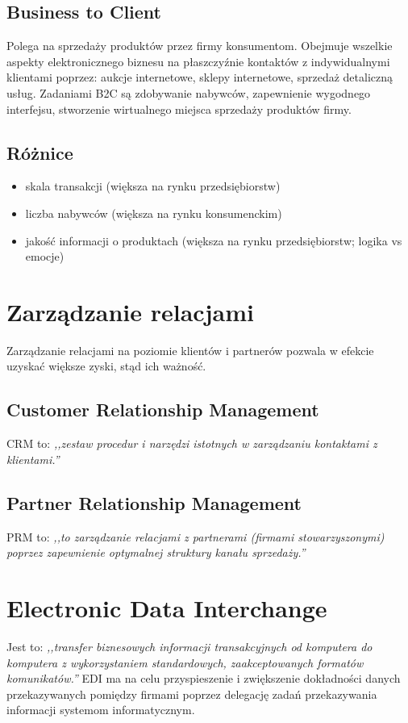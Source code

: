 \documentclass{article}
\begin{document}
\subsection{Business to Client}
Polega na sprzedaży produktów przez firmy konsumentom. Obejmuje wszelkie aspekty elektronicznego biznesu na płaszczyźnie kontaktów z indywidualnymi klientami poprzez: aukcje internetowe, sklepy internetowe, sprzedaż detaliczną usług. Zadaniami B2C są zdobywanie nabywców, zapewnienie wygodnego interfejsu, stworzenie wirtualnego miejsca sprzedaży produktów firmy.
\subsection{Różnice}
\begin{itemize}
\item skala transakcji (większa na rynku przedsiębiorstw)
\item liczba nabywców (większa na rynku konsumenckim)
\item jakość informacji o produktach (większa na rynku przedsiębiorstw; logika vs emocje)
\end{itemize}
\section{Zarządzanie relacjami}
Zarządzanie relacjami na poziomie klientów i partnerów pozwala w efekcie uzyskać większe zyski, stąd ich ważność.
\subsection{Customer Relationship Management}
CRM to: \emph{,,zestaw procedur i narzędzi istotnych w zarządzaniu kontaktami z klientami.''}\cite{wiki:crm}
\subsection{Partner Relationship Management}
PRM to: \emph{,,to zarządzanie relacjami z partnerami (firmami stowarzyszonymi) poprzez zapewnienie optymalnej struktury kanału sprzedaży.''}\cite{wiki:prm}
\section{Electronic Data Interchange}
Jest to: \emph{,,transfer biznesowych informacji transakcyjnych od komputera do komputera z wykorzystaniem standardowych, zaakceptowanych formatów komunikatów.''}\cite{wiki:edi} EDI ma na celu przyspieszenie i zwiększenie dokładności danych przekazywanych pomiędzy firmami poprzez delegację zadań przekazywania informacji systemom informatycznym.
{}

\end{document}
